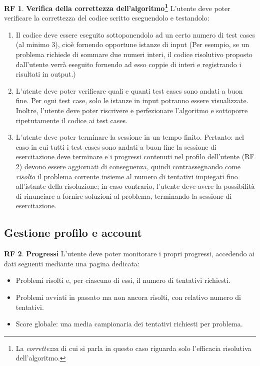 \documentclass[11pt, a4paper]{article}
\theoremstyle{definition}
\newtheorem{funcreq}{RF} %
\begin{document}
\begin{funcreq}
\label{test}
\textbf{Verifica della correttezza dell'algoritmo\footnote{La \textit{correttezza} di cui si parla in questo caso riguarda solo l'efficacia risolutiva dell'algoritmo.} }
L'utente deve poter verificare la correttezza del codice scritto eseguendolo
e testandolo:
\begin{enumerate}
    \item Il codice deve essere eseguito sottoponendolo ad un certo numero
    di test cases (al minimo 3),
    cioè fornendo opportune istanze di input (Per esempio,
    se un problema richiede di sommare due numeri interi, il codice risolutivo
    proposto dall'utente verrà eseguito fornendo ad esso coppie di interi
    e registrando i risultati in output.)

    \item L'utente deve poter verificare quali e quanti test cases sono andati
    a buon fine. Per ogni test case, solo le istanze in input potranno
    essere visualizzate. Inoltre, l'utente deve poter riscrivere e
    perfezionare l'algoritmo e sottoporre ripetutamente il codice ai
    test cases.

    \item L'utente deve poter terminare la sessione in un tempo finito.
    Pertanto: nel caso in cui tutti i test cases sono andati a buon fine
    la sessione di esercitazione deve terminare e i progressi contenuti
    nel profilo dell'utente (RF \ref{stats}) devono essere aggiornati
    di conseguenza, quindi contrassegnando come
    \textit{risolto} il problema corrente insieme al numero di
    tentativi impiegati fino all'istante della risoluzione; in caso contrario,
    l'utente deve avere la possibilità di rinunciare a fornire soluzioni
    al problema, terminando la sessione di esercitazione.
\end{enumerate}
\end{funcreq}

\subsection{Gestione profilo e account}

\begin{funcreq}
\label{stats}
\textbf{Progressi }
L'utente deve poter monitorare i propri progressi, accedendo ai dati
seguenti mediante una pagina dedicata:
\begin{itemize}
    \item Problemi risolti e, per ciascuno di essi, il numero di tentativi richiesti.
    \item Problemi avviati in passato ma non ancora risolti, con relativo
    numero di tentativi.
    \item Score globale: una media campionaria dei tentativi richiesti
    per problema.
\end{itemize}
\end{funcreq}
\end{document}
